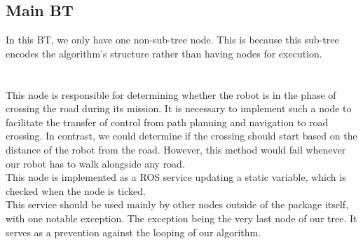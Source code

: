     \subsection{Main BT}
        In this BT, we only have one non-sub-tree node. This is because this sub-tree encodes the algorithm's structure rather than having nodes for execution.\\\\
        \\
            This node is responsible for determining whether the robot is in the phase of crossing the road during its mission. It is necessary to implement such a node to facilitate the transfer of control from path planning and navigation to road crossing. In contrast, we could determine if the crossing should start based on the distance of the robot from the road. However, this method would fail whenever our robot has to walk alongside any road.\\
            This node is implemented as a ROS service updating a static variable, which is checked when the node is ticked.\\
            This service should be used mainly by other nodes outside of the package itself, with one notable exception. The exception being the very last node of our tree. It serves as a prevention against the looping of our algorithm.
    
    
    
    